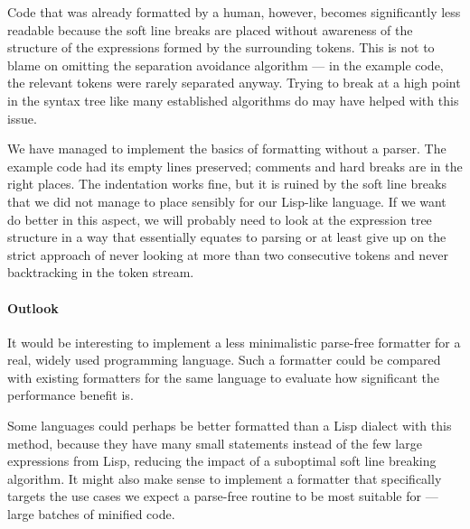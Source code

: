 Code that was already formatted by a human, however,
becomes significantly less readable
because the soft line breaks are placed
without awareness of the structure of the expressions
formed by the surrounding tokens.
This is not to blame on omitting the separation avoidance algorithm ---
in the example code, the relevant tokens were rarely separated anyway.
Trying to break at a high point in the syntax tree
like many established algorithms do
may have helped with this issue.

We have managed to implement the basics of formatting without a parser.
The example code had its empty lines preserved;
comments and hard breaks are in the right places.
The indentation works fine, but it is ruined by
the soft line breaks that we did not manage to place sensibly
for our Lisp-like language.
If we want do better in this aspect,
we will probably need to look at the expression tree structure
in a way that essentially equates to parsing
or at least give up on the strict approach
of never looking at more than two consecutive tokens
and never backtracking in the token stream.

\paragraph{Outlook}
It would be interesting to implement a
less minimalistic parse-free formatter
for a real, widely used programming language.
Such a formatter could be compared with
existing formatters for the same language
to evaluate how significant the performance benefit is.

Some languages could perhaps be
better formatted than a Lisp dialect with this method,
because they have many small statements
instead of the few large expressions from Lisp,
reducing the impact of a suboptimal soft line breaking algorithm.
It might also make sense to implement a formatter
that specifically targets the use cases
we expect a parse-free routine to be most suitable for
--- large batches of minified code.
